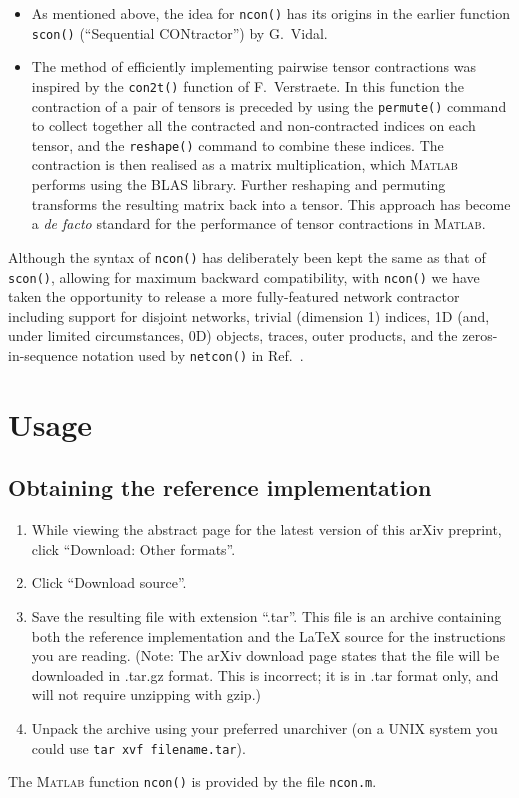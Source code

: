 \documentclass[aps,prb,reprint,superscriptaddress,amsmath,amsfonts]{revtex4-1}
\theoremstyle{definition}
\newcommand{\rcite}[1]{Ref.~\onlinecite{#1}}
\newcommand{\MATLAB}{\textsc{Matlab}}
\newcommand{\ttt}[1]{\texttt{#1}}
\begin{document}
\begin{itemize}
\item As mentioned above, the idea for \ttt{ncon()} has its origins in the earlier function \ttt{scon()} (``Sequential CONtractor'') by G.~Vidal.
\item The method of efficiently implementing pairwise tensor contractions was inspired by the \ttt{con2t()} function of F.~Verstraete. In this function the contraction of a pair of tensors %
is preceded by using the \ttt{permute()} command to collect together all the contracted and non-contracted indices on each tensor, and the \ttt{reshape()} command to combine these indices. The contraction is then realised as a matrix multiplication, which \MATLAB{} performs using the BLAS library. Further reshaping and permuting transforms the resulting matrix back into a tensor. This approach has become a \emph{de facto} standard for the performance of tensor contractions in \MATLAB{}.
\end{itemize}

Although the syntax of \ttt{ncon()} has deliberately been kept the same as that of \ttt{scon()}, allowing for maximum backward compatibility, with \ttt{ncon()} we have taken the opportunity to release a more fully-featured network contractor
including support for disjoint networks, trivial (dimension 1) indices, 1D (and, under limited circumstances, 0D) objects, traces, outer products, and the zeros-in-{sequence} notation used by \ttt{netcon()} in \rcite{pfeifer2013a}.


\section{Usage}

\subsection{Obtaining the reference implementation\label{sec:obtain}}

\begin{enumerate}
\item While viewing the abstract page for the latest version of this arXiv preprint, click ``Download: Other formats''.
\item Click ``Download source''.
\item Save the resulting file with extension ``.tar''. This file is an archive containing both the reference implementation and the \LaTeX{} source for the instructions you are reading. (Note: The arXiv download page states that the file will be downloaded in .tar.gz format. This is incorrect; it is in .tar format only, and will not require unzipping with gzip.)
\item Unpack the archive using your preferred unarchiver (on a UNIX system you could use \texttt{tar xvf filename.tar}).
\end{enumerate}
The \MATLAB{} function \ttt{ncon()} is provided by the file \texttt{ncon.m}. 
\end{document}
